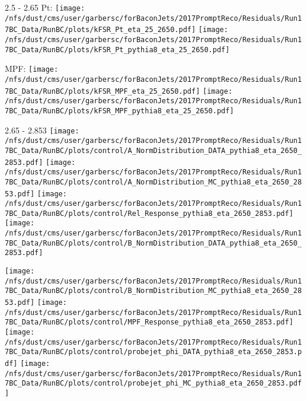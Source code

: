 \documentclass[t,compress]{beamer}
\begin{document}
\begin{frame}{2.5 - 2.65}
	 Pt: \texttt{[image: /nfs/dust/cms/user/garbersc/forBaconJets/2017PromptReco/Residuals/Run17BC\_Data/RunBC/plots/kFSR\_Pt\_eta\_25\_2650.pdf]}
	\texttt{[image: /nfs/dust/cms/user/garbersc/forBaconJets/2017PromptReco/Residuals/Run17BC\_Data/RunBC/plots/kFSR\_Pt\_pythia8\_eta\_25\_2650.pdf]}
\newline

	 MPF: \texttt{[image: /nfs/dust/cms/user/garbersc/forBaconJets/2017PromptReco/Residuals/Run17BC\_Data/RunBC/plots/kFSR\_MPF\_eta\_25\_2650.pdf]}
	\texttt{[image: /nfs/dust/cms/user/garbersc/forBaconJets/2017PromptReco/Residuals/Run17BC\_Data/RunBC/plots/kFSR\_MPF\_pythia8\_eta\_25\_2650.pdf]}
\end{frame}

\begin{frame}{2.65 - 2.853}
	\texttt{[image: /nfs/dust/cms/user/garbersc/forBaconJets/2017PromptReco/Residuals/Run17BC\_Data/RunBC/plots/control/A\_NormDistribution\_DATA\_pythia8\_eta\_2650\_2853.pdf]}
	\texttt{[image: /nfs/dust/cms/user/garbersc/forBaconJets/2017PromptReco/Residuals/Run17BC\_Data/RunBC/plots/control/A\_NormDistribution\_MC\_pythia8\_eta\_2650\_2853.pdf]}
	\texttt{[image: /nfs/dust/cms/user/garbersc/forBaconJets/2017PromptReco/Residuals/Run17BC\_Data/RunBC/plots/control/Rel\_Response\_pythia8\_eta\_2650\_2853.pdf]}
	\texttt{[image: /nfs/dust/cms/user/garbersc/forBaconJets/2017PromptReco/Residuals/Run17BC\_Data/RunBC/plots/control/B\_NormDistribution\_DATA\_pythia8\_eta\_2650\_2853.pdf]}
\newline

	\texttt{[image: /nfs/dust/cms/user/garbersc/forBaconJets/2017PromptReco/Residuals/Run17BC\_Data/RunBC/plots/control/B\_NormDistribution\_MC\_pythia8\_eta\_2650\_2853.pdf]}
	\texttt{[image: /nfs/dust/cms/user/garbersc/forBaconJets/2017PromptReco/Residuals/Run17BC\_Data/RunBC/plots/control/MPF\_Response\_pythia8\_eta\_2650\_2853.pdf]}
	\texttt{[image: /nfs/dust/cms/user/garbersc/forBaconJets/2017PromptReco/Residuals/Run17BC\_Data/RunBC/plots/control/probejet\_phi\_DATA\_pythia8\_eta\_2650\_2853.pdf]}
	\texttt{[image: /nfs/dust/cms/user/garbersc/forBaconJets/2017PromptReco/Residuals/Run17BC\_Data/RunBC/plots/control/probejet\_phi\_MC\_pythia8\_eta\_2650\_2853.pdf]}
\end{frame}
\end{document}
